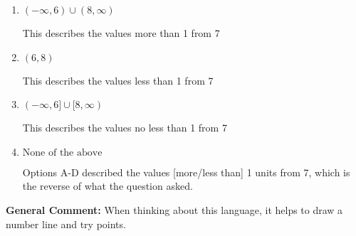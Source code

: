 \documentclass{extbook}[14pt]
\begin{document}
\begin{enumerate}
{\begin{enumerate}[label=\Alph*.]
This describes the values no more than 1 from 7
\item \( (-\infty, 6) \cup (8, \infty) \)

This describes the values more than 1 from 7
\item \( (6, 8) \)

This describes the values less than 1 from 7
\item \( (-\infty, 6] \cup [8, \infty) \)

This describes the values no less than 1 from 7
\item \( \text{None of the above} \)

Options A-D described the values [more/less than] 1 units from 7, which is the reverse of what the question asked.
\end{enumerate}

\textbf{General Comment:} When thinking about this language, it helps to draw a number line and try points.
}
\end{enumerate}
\end{document}
